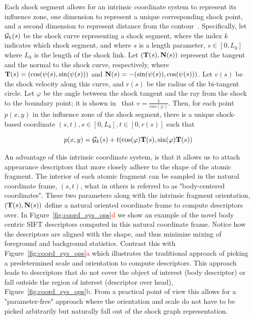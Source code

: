 Each shock segment allows for an intrinsic coordinate system to represent its influence zone, one dimension to represent a unique corresponding shock point, and a second dimension to represent distance from the contour~\cite{Giblin:Kimia:Reconstruction:PAMI03}. Specifically, let ${\G}_{k}(s)$ be the shock curve representing a shock segment, where the index $k$ indicates which shock segment, and where $s$ is a length parameter, $s \in [0, L_{k}]$ where $L_{k}$ is the length of the shock link. Let $({\bf T}(s), {\bf N}(s))$ represent the tangent and the normal to the shock curve, respectively, where ${\bf T}(s)=(\cos(\psi(s),\sin(\psi(s)))$ and ${\bf N}(s)=-(\sin(\psi(s)),\cos(\psi(s)))$. Let $v(s)$ be the shock velocity along this curve, and $r(s)$ be the radius of the bi-tangent circle. Let $\varphi$ be the angle between the shock tangent and the ray from the shock to the boundary point; it is shown in~\cite{Giblin:Kimia:Reconstruction:PAMI03} that $v=\frac{1}{cos(\varphi)}$. Then, for each point $p(x,y)$ in the influence zone of the shock segment, there is a unique shock-based coordinate $(s, t), s \in [0, L_{k}], t \in [0,r(s)]$ such that 

\begin{equation}
p(x,y) = \G_k(s) + t(\cos(\varphi)\T(s),\sin(\varphi)\T(s))
\end{equation}

An advantage of this intrinsic coordinate system, is that it allows us to attach appearance descriptors that more closely adhere to the shape of the atomic fragment. The interior of each atomic fragment can be sampled in the natural coordinate frame, $(s,t)$, what in others is referred to as "body-centered coordinates". These two parameters along with the intrinsic fragment orientation, $({\bf T}(s),{\bf N}(s))$  define a natural oriented coordinate frame to compute descriptors over. In Figure~\ref{fig:coord_sys_ops}\textcolor{red}{d} we show an example of the novel body centric SIFT descriptors computed in this natural coordinate frame. Notice how the descriptors are aligned with the shape, and thus minimize mixing of foreground and background statistics. Contrast this with Figure~\ref{fig:coord_sys_ops}\textcolor{red}{a} which illustrates the traditional approach of picking a predetermined scale and orientation to compute descriptors. This approach leads to descriptors that do not cover the object of interest (body descriptor) or fall outside the region of interest (descriptor over head),  Figure~\ref{fig:coord_sys_ops}\textcolor{red}{b}. From a practical point of view this allows for a "parameter-free" approach where the orientation and scale do not have to be picked arbitrarily but naturally fall out of the shock graph representation. 

